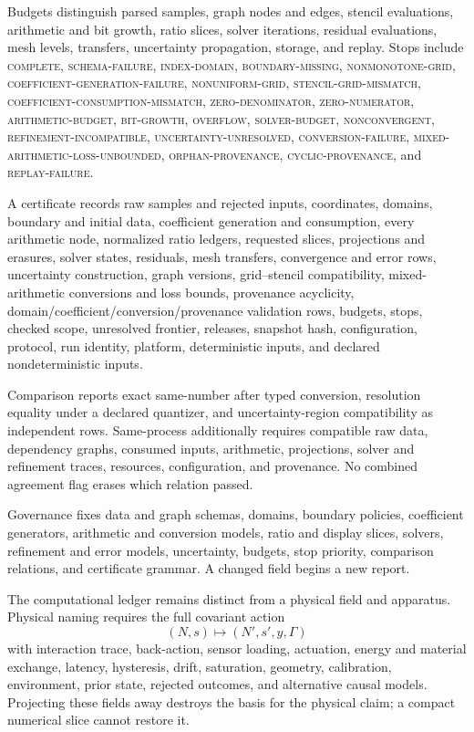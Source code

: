 Budgets distinguish parsed samples, graph nodes and edges, stencil evaluations, arithmetic and bit growth, ratio
slices, solver iterations, residual evaluations, mesh levels, transfers, uncertainty propagation, storage, and
replay.  Stops include \textsc{complete}, \textsc{schema-failure}, \textsc{index-domain},
\textsc{boundary-missing}, \textsc{nonmonotone-grid}, \textsc{coefficient-generation-failure},
\textsc{nonuniform-grid}, \textsc{stencil-grid-mismatch}, \textsc{coefficient-consumption-mismatch},
\textsc{zero-denominator}, \textsc{zero-numerator},
\textsc{arithmetic-budget}, \textsc{bit-growth}, \textsc{overflow}, \textsc{solver-budget},
\textsc{nonconvergent}, \textsc{refinement-incompatible}, \textsc{uncertainty-unresolved},
\textsc{conversion-failure}, \textsc{mixed-arithmetic-loss-unbounded}, \textsc{orphan-provenance},
\textsc{cyclic-provenance}, and \textsc{replay-failure}.

A certificate records raw samples and rejected inputs, coordinates, domains, boundary and initial data, coefficient
generation and consumption, every arithmetic node, normalized ratio ledgers, requested slices, projections and
erasures, solver states, residuals, mesh transfers, convergence and error rows, uncertainty construction, graph
versions, grid--stencil compatibility, mixed-arithmetic conversions and loss bounds, provenance acyclicity,
domain/coefficient/conversion/provenance validation rows, budgets, stops, checked scope, unresolved frontier,
releases, snapshot hash, configuration, protocol, run
identity, platform, deterministic inputs, and declared nondeterministic inputs.

Comparison reports exact same-number after typed conversion, resolution equality under a declared quantizer, and
uncertainty-region compatibility as independent rows.  Same-process additionally requires compatible raw data,
dependency graphs, consumed inputs, arithmetic, projections, solver and refinement traces, resources, configuration,
and provenance.  No combined agreement flag erases which relation passed.

Governance fixes data and graph schemas, domains, boundary policies, coefficient generators, arithmetic and conversion
models, ratio and display slices, solvers, refinement and error models, uncertainty, budgets, stop priority,
comparison relations, and certificate grammar.  A changed field begins a new report.

The computational ledger remains distinct from a physical field and apparatus.  Physical naming requires the full
covariant action
\[
(N,s)\longmapsto(N',s',y,\Gamma)
\]
with interaction trace, back-action, sensor loading, actuation, energy and material exchange, latency, hysteresis,
drift, saturation, geometry, calibration, environment, prior state, rejected outcomes, and alternative causal models.
Projecting these fields away destroys the basis for the physical claim; a compact numerical slice cannot restore it.


